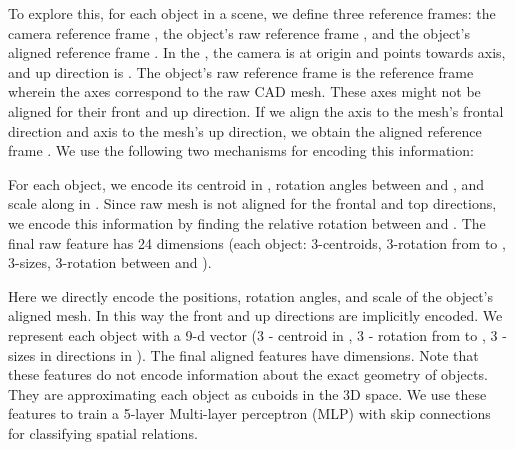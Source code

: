 \documentclass{article}
\newcommand{\smallsec}[1]{\noindent {\bf #1.}}
\begin{document}
To explore this, for each object in a scene, we define three reference frames: the camera reference frame , the object's raw reference frame , and the object's aligned reference frame . In the , the camera is at origin and points towards  axis, and up direction is . The object's raw reference frame  is the reference frame wherein the axes correspond to the raw CAD mesh. These axes might not be aligned for their front and up direction. If we align the  axis to the mesh's frontal direction and  axis to the mesh's up direction, we obtain the aligned reference frame . We use the following two mechanisms for encoding this information:

\smallsec{Raw features} For each object, we encode its centroid in , rotation angles between  and , and scale along  in . Since raw mesh is not aligned for the frontal and top directions, we encode this information by finding the relative rotation between  and . The final raw feature has 24 dimensions (each object: 3-centroids, 3-rotation from  to , 3-sizes, 3-rotation between  and ).
    
\smallsec{Aligned features} Here we directly encode the positions, rotation angles, and scale of the object's aligned mesh. In this way the front and up directions are implicitly encoded. We represent each object with a 9-d vector (3 - centroid in , 3 - rotation from  to , 3 - sizes in  directions in ). The final aligned features have  dimensions.
Note that these features do not encode information about the exact geometry of objects. They are approximating each object as cuboids in the 3D space. We use these features to train a 5-layer Multi-layer perceptron (MLP) with skip connections for classifying spatial relations.
\end{document}
